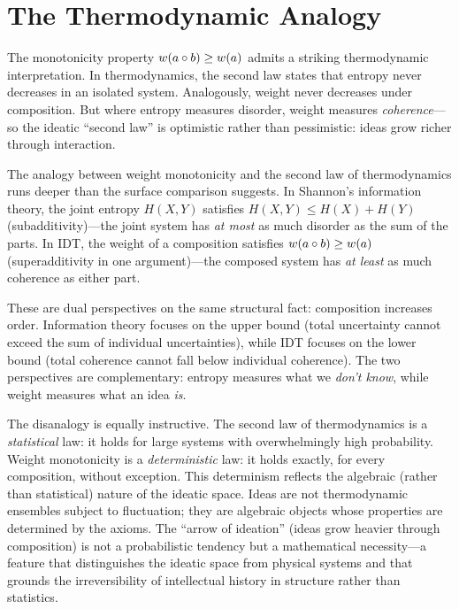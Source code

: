 \section{The Thermodynamic Analogy}

The monotonicity property $w(a \circ b) \geq w(a)$ admits a striking
thermodynamic interpretation. In thermodynamics, the second law states
that entropy never decreases in an isolated system. Analogously, weight
never decreases under composition. But where entropy measures disorder,
weight measures \emph{coherence}---so the ideatic ``second law'' is
optimistic rather than pessimistic: ideas grow richer through interaction.

\begin{interpretation}\label{interp:ch3:thermodynamic_information}
The analogy between weight monotonicity and the second law of
thermodynamics runs deeper than the surface comparison suggests. In
Shannon's information theory, the joint entropy $H(X, Y)$ satisfies
$H(X, Y) \leq H(X) + H(Y)$ (subadditivity)---the joint system has
\emph{at most} as much disorder as the sum of the parts. In IDT, the
weight of a composition satisfies $w(a \circ b) \geq w(a)$
(superadditivity in one argument)---the composed system has \emph{at
least} as much coherence as either part.

These are dual perspectives on the same structural fact: composition
increases order. Information theory focuses on the upper bound (total
uncertainty cannot exceed the sum of individual uncertainties), while
IDT focuses on the lower bound (total coherence cannot fall below
individual coherence). The two perspectives are complementary: entropy
measures what we \emph{don't know}, while weight measures what an idea
\emph{is}.

The disanalogy is equally instructive. The second law of thermodynamics
is a \emph{statistical} law: it holds for large systems with overwhelmingly
high probability. Weight monotonicity is a \emph{deterministic} law: it
holds exactly, for every composition, without exception. This
determinism reflects the algebraic (rather than statistical) nature of
the ideatic space. Ideas are not thermodynamic ensembles subject to
fluctuation; they are algebraic objects whose properties are determined
by the axioms. The ``arrow of ideation'' (ideas grow heavier through
composition) is not a probabilistic tendency but a mathematical
necessity---a feature that distinguishes the ideatic space from
physical systems and that grounds the irreversibility of intellectual
history in structure rather than statistics.
\end{interpretation}

